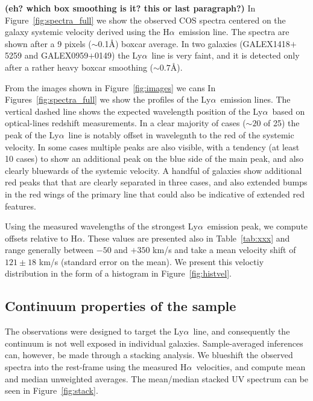 \documentclass[manuscript]{emulateapj}
\newcommand{\lya}{Ly$\alpha$}
\newcommand{\ha}{H$\alpha$}
\begin{document}
\textbf{(eh? which box smoothing is it? this or last paragraph?)}
In Figure~\ref{fig:spectra_full} we show the observed COS spectra
centered on the galaxy systemic velocity derived using the \ha\
emission line. The spectra are shown after a 9 pixels ($\sim$0.1\AA)
boxcar average. In two galaxies (GALEX1418$+$5259 and
GALEX0959$+$0149) the \lya\ line is very faint, and it is detected
only after a rather heavy boxcar smoothing ($\sim 0.7$\AA).

From the images shown in Figure~\ref{fig:images} we cans 
In Figures~\ref{fig:spectra_full} we show the profiles of the \lya\
emission lines. The vertical dashed line shows the expected wavelength
position of the \lya\ based on optical-lines redshift measurements.
In a clear majority of cases ($\sim 20$ of 25) the peak of the \lya\ 
line is notably offset in wavelegnth to the red of the systemic 
velocity. In some cases multiple peaks are also visible, with a 
tendency (at least 10 cases) to show an additional peak on the blue
side of the main peak, and also clearly bluewards of the systemic
velocity. A handful of galaxies show additional red peaks that 
that are clearly separated in three cases, and also extended bumps 
in the red wings of the primary line that could also be indicative of 
extended red features. 

Using the measured wavelengths of the strongest \lya\ emission peak, 
we compute offsets relative to \ha. These values are presented also in
Table~\ref{tab:xxx} and range generally between $-50$ and $+350$ km/s
and take a mean velocity shift of $121\pm 18$ km/s (standard error on
the mean). We present this veloctiy distribution in the form of a 
histogram in Figure~\ref{fig:histvel}. 

\subsection{Continuum properties of the sample}

The observations were designed to target the \lya\ line, and 
consequently the continuum is not well exposed in individual galaxies. 
Sample-averaged inferences can, however, be made through a stacking
analysis. We blueshift the observed spectra into the rest-frame using
the measured \ha\ velocities, and compute mean and median unweighted 
averages. The mean/median stacked UV spectrum can be seen in 
Figure~\ref{fig:stack}. 
\end{document}
